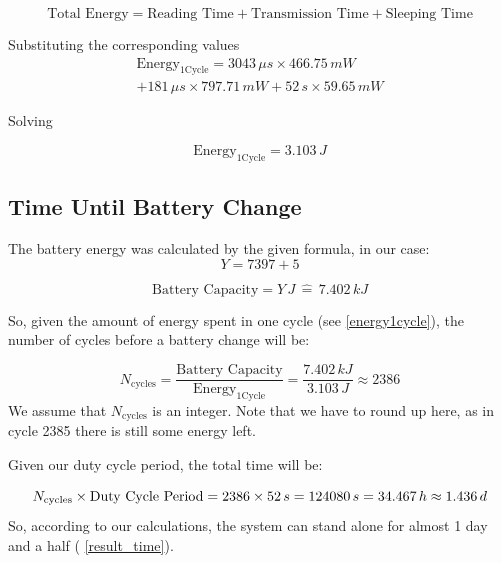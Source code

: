 \documentclass{article}
\begin{document}
\begin{equation}
\text{Total Energy} = \text{Reading Time} + \text{Transmission Time} + \text{Sleeping Time} 
\end{equation}

\noindent Substituting the corresponding values
\begin{equation}
    \begin{aligned}
    \text{Energy}_{\text{1Cycle}} = 3043\,\mu s \times 466.75\,mW \\+  181\,\mu s \times 797.71\,mW + 52\,s \times 59.65\,mW
    \end{aligned}
\end{equation}

\noindent Solving

\begin{equation}\label{energy1cycle}
    \text{Energy}_{\text{1Cycle}} = 3.103\,J
\end{equation}

\subsection{Time Until Battery Change}
The battery energy was calculated by the given formula, in our case:
\begin{equation}
    Y = 7397 + 5   
\end{equation}

\begin{equation}
    \text{Battery Capacity} = Y\,J \,\widehat{=}\, 7.402\,kJ
\end{equation}

\noindent So, given the amount of energy spent in one cycle (see \autoref{energy1cycle}), the number of cycles before a battery change will be:

\begin{equation}
    N_{\text{cycles}} = \frac{\text{Battery Capacity}}{\text{Energy}_{\text{1Cycle}}}
    = \frac{7.402\,kJ}{3.103\,J} \approx 2386
\end{equation}
We assume that $N_{\text{cycles}}$ is an integer.
Note that we have to round up here, as in cycle 2385 there is still some energy left.

\noindent Given our duty cycle period, the total time will be:

\begin{equation} \label{result_time}
     N_{\text{cycles}} \times \text{Duty Cycle Period} = 2386 \times 52\,s \\= 124080\,s = 34.467\,h \approx 1.436\,d 
\end{equation}
So, according to our calculations, the system can stand alone for almost 1 day and a half ( \autoref{result_time}).
\end{document}
